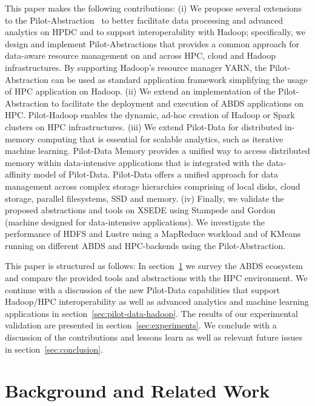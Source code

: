 \documentclass{sig-alternate}
\newcommand{\pilot}{Pilot\xspace}
\newcommand{\pilotdata}{Pilot-Data\xspace}
\newcommand{\pilotdatainmem}{Pilot-Data Memory\xspace}
\begin{document}
This paper makes the following contributions: (i) We propose several
extensions to the \pilot-Abstraction~\cite{pstar12} to better
facilitate data processing and advanced analytics on HPDC and to
support interoperability with Hadoop; specifically, we design and
implement \pilot-Abstractions that provides a common approach for
data-aware resource management on and across HPC, cloud and Hadoop
infrastructures. By supporting Hadoop's resource manager YARN, the
\pilot-Abstraction can be used as standard application framework
simplifying the usage of HPC application on Hadoop. (ii) We extend an
implementation of the \pilot-Abstraction to facilitate the deployment
and execution of ABDS applications on HPC. \pilot-Hadoop enables the
dynamic, ad-hoc creation of Hadoop or Spark clusters on HPC
infrastructures. (iii) We extend \pilotdata for distributed in-memory
computing that is essential for scalable analytics, such as iterative
machine learning. \pilotdatainmem provides a unified way to access
distributed memory within data-intensive applications that is
integrated with the data-affinity model of \pilotdata. \pilotdata
offers a unified approach for data management across complex storage
hierarchies comprising of local disks, cloud storage, parallel
filesystems, SSD and memory. (iv) Finally, we validate the proposed
abstractions and tools on XSEDE using Stampede and Gordon (machine
designed for data-intensive applications). We investigate the
performance of HDFS and Lustre using a MapReduce workload and of
KMeans running on different ABDS and HPC-backends using the
\pilot-Abstraction.        
      
This paper is structured as follows: In section~\ref{sec:related} we
survey the ABDS ecosystem and compare the provided tools and
abstractions with the HPC environment.
We continue with a discussion of the new \pilotdata capabilities that support
Hadoop/HPC interoperability as well as advanced analytics and machine learning
applications in section~\ref{sec:pilot-data-hadoop}. The results of our
experimental validation are presented in section~\ref{sec:experiments}. We
conclude with a discussion of the contributions and lessons learn as well as
relevant future issues in section~\ref{sec:conclusion}.



\section{Background and Related Work}
\label{sec:related}
\end{document}
